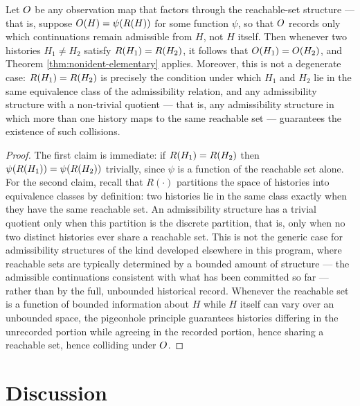 \begin{theorem}
\label{thm:nonident-structural}
Let $O$ be any observation map that factors through the
reachable-set structure --- that is, suppose $O(H) = \psi(R(H))$
for some function $\psi$, so that $O$ records only which
continuations remain admissible from $H$, not $H$ itself. Then whenever
two histories $H_1 \neq H_2$ satisfy $R(H_1) = R(H_2)$, it
follows that $O(H_1) = O(H_2)$, and Theorem
\ref{thm:nonident-elementary} applies. Moreover, this is not a
degenerate case: $R(H_1) = R(H_2)$ is precisely the condition
under which $H_1$ and $H_2$ lie in the same equivalence class of the
admissibility relation, and any admissibility structure with a
non-trivial quotient --- that is, any admissibility structure in which
more than one history maps to the same reachable set --- guarantees the
existence of such collisions.
\end{theorem}

\begin{proof}
The first claim is immediate: if $R(H_1) = R(H_2)$ then
$\psi(R(H_1)) = \psi(R(H_2))$ trivially, since $\psi$ is a
function of the reachable set alone. For the second claim, recall that
$R(\cdot)$ partitions the space of histories into equivalence classes by
definition: two histories lie in the same class exactly when they have
the same reachable set. An admissibility structure has a trivial
quotient only when this partition is the discrete partition, that is,
only when no two distinct histories ever share a reachable set. This is
not the generic case for admissibility structures of the kind developed
elsewhere in this program, where reachable sets are typically determined
by a bounded amount of structure --- the admissible continuations
consistent with what has been committed so far --- rather than by the
full, unbounded historical record. Whenever the reachable set is a
function of bounded information about $H$ while $H$ itself can vary over
an unbounded space, the pigeonhole principle guarantees histories
differing in the unrecorded portion while agreeing in the recorded
portion, hence sharing a reachable set, hence colliding under $O$.
\end{proof}

\section{Discussion}

